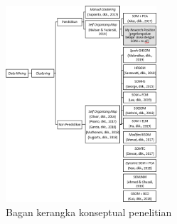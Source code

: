 \begin{figure}[h]
	\centering
	\includegraphics[width=0.5\textwidth]{Gambar/bagankerangka}
	\caption{Bagan kerangka konseptual penelitian}
	\label{fig:g5}
\end{figure}

